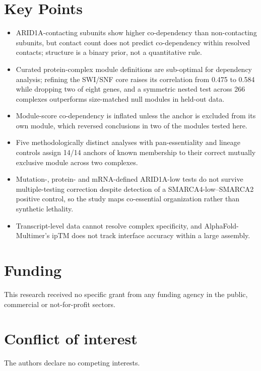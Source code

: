 \documentclass[11pt,a4paper]{article}
\begin{document}
\section*{Key Points}
\begin{itemize}[leftmargin=1.2em,itemsep=2pt,topsep=2pt]
\item ARID1A-contacting subunits show higher co-dependency than non-contacting
subunits, but contact count does not predict co-dependency within resolved
contacts; structure is a binary prior, not a quantitative rule.
\item Curated protein-complex module definitions are sub-optimal for dependency
analysis; refining the SWI/SNF core raises its correlation from 0.475 to 0.584
while dropping two of eight genes, and a symmetric nested test across 266
complexes outperforms size-matched null modules in held-out data.
\item Module-score co-dependency is inflated unless the anchor is excluded from
its own module, which reversed conclusions in two of the modules tested here.
\item Five methodologically distinct analyses with pan-essentiality and lineage controls
assign 14/14 anchors of known membership to their correct mutually exclusive
module across two complexes.
\item Mutation-, protein- and mRNA-defined ARID1A-low tests do not survive
multiple-testing correction despite detection of a SMARCA4-low--SMARCA2 positive
control, so the study maps co-essential organization rather than synthetic
lethality.
\item Transcript-level data cannot resolve complex specificity, and
AlphaFold-Multimer's ipTM does not track interface accuracy within a large
assembly.
\end{itemize}

\section*{Funding}
This research received no specific grant from any funding agency in the public,
commercial or not-for-profit sectors.

\section*{Conflict of interest}
The authors declare no competing interests.

\end{document}
